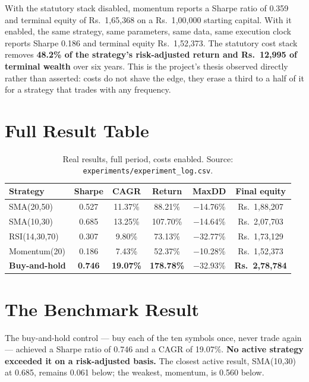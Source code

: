 \documentclass[12pt,a4paper,oneside]{report}
\newcommand{\rupee}{Rs.\ }
\begin{document}
With the statutory stack disabled, momentum reports a Sharpe ratio of 0.359 and
terminal equity of \rupee{}1{,}65{,}368 on a \rupee{}1{,}00{,}000 starting
capital. With it enabled, the same strategy, same parameters, same data, same
execution clock reports Sharpe 0.186 and terminal equity \rupee{}1{,}52{,}373.
The statutory cost stack removes \textbf{48.2\% of the strategy's risk-adjusted
return and \rupee{}12{,}995 of terminal wealth} over six years. This is the
project's thesis observed directly rather than asserted: costs do not shave the
edge, they erase a third to a half of it for a strategy that trades with any
frequency.

\section{Full Result Table}

\begin{table}[h]
\centering
\caption[Real Backtest Performance Matrix (Full Period)]{Real results, full period, costs enabled. Source: \texttt{experiments/experiment\_log.csv}.}
\label{tab:full}
\begin{tabular}{@{}lccccc@{}}
\toprule
\textbf{Strategy} & \textbf{Sharpe} & \textbf{CAGR} & \textbf{Return} & \textbf{MaxDD} & \textbf{Final equity} \\
\midrule
SMA(20,50)   & 0.527 & 11.37\% &  88.21\% & $-$14.76\% & \rupee{}1{,}88{,}207 \\
SMA(10,30)   & 0.685 & 13.25\% & 107.70\% & $-$14.64\% & \rupee{}2{,}07{,}703 \\
RSI(14,30,70)& 0.307 &  9.80\% &  73.13\% & $-$32.77\% & \rupee{}1{,}73{,}129 \\
Momentum(20) & 0.186 &  7.43\% &  52.37\% & $-$10.28\% & \rupee{}1{,}52{,}373 \\
\midrule
\textbf{Buy-and-hold} & \textbf{0.746} & \textbf{19.07\%} & \textbf{178.78\%} & $-$32.93\% & \textbf{\rupee{}2{,}78{,}784} \\
\bottomrule
\end{tabular}
\end{table}

\section{The Benchmark Result}

The buy-and-hold control --- buy each of the ten symbols once, never trade again
--- achieved a Sharpe ratio of 0.746 and a CAGR of 19.07\%. \textbf{No active
strategy exceeded it on a risk-adjusted basis.} The closest active result,
SMA(10,30) at 0.685, remains 0.061 below; the weakest, momentum, is 0.560 below.
\end{document}
